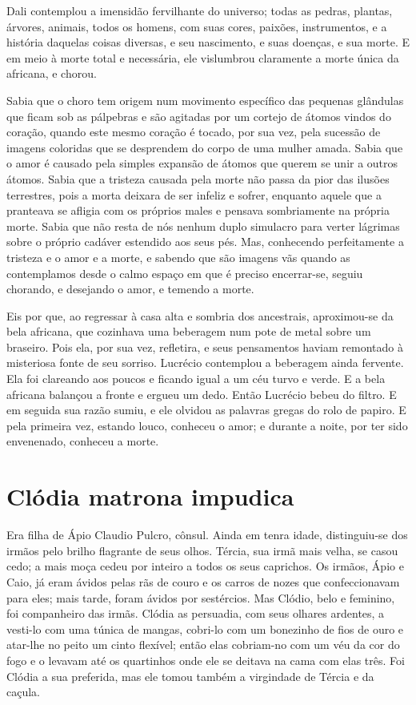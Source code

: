 Dali contemplou a imensidão fervilhante do universo; todas as pedras,
plantas, árvores, animais, todos os homens, com suas cores, paixões,
instrumentos, e a história daquelas coisas diversas, e seu nascimento, e
suas doenças, e sua morte. E em meio à morte total e necessária, ele
vislumbrou claramente a morte única da africana, e chorou.

Sabia que o choro tem origem num movimento específico das pequenas
glândulas que ficam sob as pálpebras e são agitadas por um cortejo de
átomos vindos do coração, quando este mesmo coração é tocado, por sua vez,
pela sucessão de imagens coloridas que se desprendem do corpo de uma
mulher amada. Sabia que o amor é causado pela simples expansão de átomos
que querem se unir a outros átomos. Sabia que a tristeza causada pela
morte não passa da pior das ilusões terrestres, pois a morta deixara de
ser infeliz e sofrer, enquanto aquele que a pranteava se afligia com os
próprios males e pensava sombriamente na própria morte. Sabia que não
resta de nós nenhum duplo simulacro para verter lágrimas sobre o próprio
cadáver estendido aos seus pés. Mas, conhecendo perfeitamente a tristeza e
o amor e a morte, e sabendo que são imagens vãs quando as contemplamos
desde o calmo espaço em que é preciso encerrar-se, seguiu chorando, e
desejando o amor, e temendo a morte.

Eis por que, ao regressar à casa alta e sombria dos ancestrais,
aproximou-se da bela africana, que cozinhava uma beberagem num pote de
metal sobre um braseiro. Pois ela, por sua vez, refletira, e seus
pensamentos haviam remontado à misteriosa fonte de seu sorriso. Lucrécio
contemplou a beberagem ainda fervente. Ela foi clareando aos poucos e
ficando igual a um céu turvo e verde. E a bela africana balançou a fronte
e ergueu um dedo. Então Lucrécio bebeu do filtro. E em seguida sua razão
sumiu, e ele olvidou as palavras gregas do rolo de papiro. E pela primeira
vez, estando louco, conheceu o amor; e durante a noite, por ter sido
envenenado, conheceu a morte.

\chapter{Clódia matrona impudica}

Era filha de Ápio Claudio Pulcro, cônsul. Ainda em tenra idade,
distinguiu-se dos irmãos pelo brilho flagrante de seus olhos. Tércia, sua
irmã mais velha, se casou cedo; a mais moça cedeu por inteiro a todos os
seus caprichos. Os irmãos, Ápio e Caio, já eram ávidos pelas rãs de couro
e os carros de nozes que confeccionavam para eles; mais tarde, foram
ávidos por sestércios. Mas Clódio, belo e feminino, foi companheiro das
irmãs. Clódia as persuadia, com seus olhares ardentes, a vesti-lo com uma
túnica de mangas, cobri-lo com um bonezinho de fios de ouro e atar-lhe no
peito um cinto flexível; então elas cobriam-no com um véu da cor do fogo e
o levavam até os quartinhos onde ele se deitava na cama com elas três. Foi
Clódia a sua preferida, mas ele tomou também a virgindade de Tércia e da
caçula.

